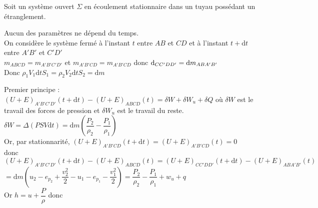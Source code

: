 ﻿\documentclass[a4paper]{article}
\begin{document}
\pagestyle{fancy}
\fancyhf{}
\setlength{\headheight}{15pt}

\begin{center}
	\large{}
\end{center}


Soit un système ouvert $\Sigma$ en écoulement stationnaire dans un tuyau possédant un étranglement.

\begin{minipage}{0.5\linewidth}
  Aucun des paramètres ne dépend du temps.\\
  On considère le système fermé à l'instant $t$ entre $AB$ et $CD$ et à l'instant $t+\mathrm{d}t$ entre $A'B'$ et $C'D'$\\
  $m_{ABCD}=m_{A'B'C'D'}$ et $m_{A'B'CD}=m_{A'B'CD}$ donc $\\\mathrm{d}_{CC'DD'}=\mathrm{d}m_{ABA'B'}$\\
  Donc $\rho_1V_1\mathrm{d}t S_1=\rho_2V_2\mathrm{d}t S_2=\mathrm{d}m$
\end{minipage}\hfill
\begin{minipage}{0.3\linewidth}
\end{minipage}\par

  Premier principe : $(U+E)_{A'B'C'D'}(t+\mathrm{d}t)-(U+E)_{ABCD}(t)=\delta W+\delta W_u+\delta Q$ où $\delta W$ est le travail des forces de pression et $\delta W_u$ est le travail du reste.\\
  $\delta W=\Delta(PSV\mathrm{d}t)=\mathrm{d}m(\dfrac{P_2}{\rho_2}-\dfrac{P_1}{\rho_1})$\\
  Or, par stationnarité, $(U+E)_{A'B'CD}(t+\mathrm{d}t)=(U+E)_{A'B'CD}(t)=0$ \\donc $(U+E)_{A'B'C'D'}(t+\mathrm{d}t)-(U+E)_{ABCD}(t)=(U+E)_{CC'DD'}(t+\mathrm{d}t)-(U+E)_{ABA'B'}(t)$\\$=\mathrm{d}m\left(u_2-e_{p_2}+\dfrac{v_2^2}{2}-u_1-e_{p_1}-\dfrac{v_1^2}{2}\right)=\dfrac{P_2}{\rho_2}-\dfrac{P_1}{\rho_1}+w_u+q$\\
  Or $h=u+\dfrac{P}{\rho}$ donc \begin{center}\end{center}
\end{document}

